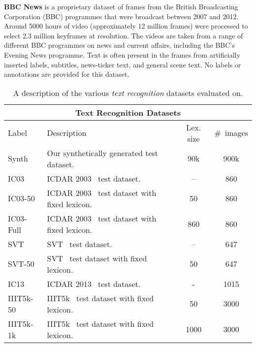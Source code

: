 \documentclass[twocolumn]{svjour3}          \smartqed  \usepackage{epsfig}
\begin{document}
{\bf BBC News}
is a proprietary dataset of frames from the British Broadcasting Corporation (BBC) programmes that were broadcast between 2007 and 2012. Around 5000 hours of video (approximately 12 million frames) were processed to select 2.3 million keyframes at  resolution. The videos are taken from a range of different BBC programmes on news and current affairs, including the BBC's Evening News programme. Text is often present in the frames from artificially inserted labels, subtitles, news-ticker text, and general scene text. No labels or annotations are provided for this dataset.

\begin{table*}[t]
\begin{center}\footnotesize
\begin{tabular}{|l|l|c|c|} \hline
\multicolumn{4}{|c|}{\bf Text Recognition Datasets}\\
\hline
Label & {\centering\footnotesize Description} & Lex. size & \#~images\\
\hline\hline
Synth        & {Our synthetically generated test dataset.} & 90k & 900k\\
\hline
IC03        & {ICDAR 2003~\cite{icdar2003dataset} test dataset.} & -- & 860\\
\hline
IC03-50     & {ICDAR 2003~\cite{icdar2003dataset} test dataset with fixed lexicon.} & 50 & 860\\
\hline
IC03-Full   & {ICDAR 2003~\cite{icdar2003dataset} test dataset with fixed lexicon.} & 860 & 860\\
\hline
SVT         & {SVT~\cite{Wang10} test dataset.} & -- & 647\\
\hline
SVT-50      & {SVT~\cite{Wang10} test dataset with fixed lexicon.} & 50 & 647\\
\hline
IC13      & {ICDAR 2013~\cite{ICDAR2013} test dataset.} & - & 1015\\
\hline
IIIT5k-50         & {IIIT5k~\cite{Mishra12} test dataset with fixed lexicon.} & 50& 3000\\
\hline
IIIT5k-1k      & {IIIT5k~\cite{Mishra12} test dataset with fixed lexicon.} & 1000 & 3000\\
\hline
\end{tabular}
\end{center}\vspace{-1em}
\caption{\small A description of the various \emph{text recognition} datasets evaluated on.}
\label{table:evalrecog}
\end{table*}
\end{document}
